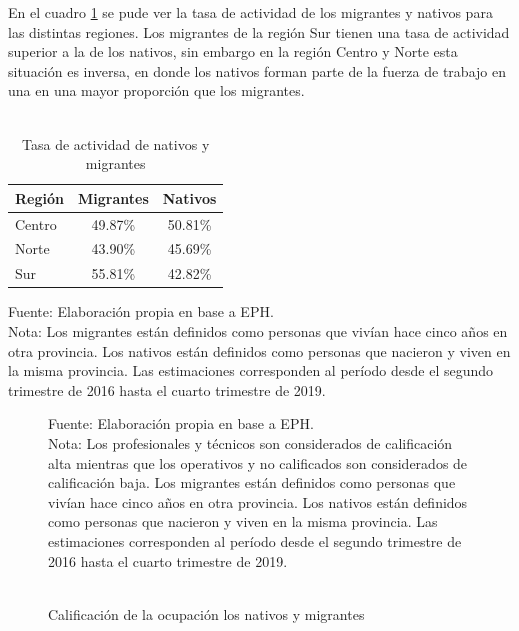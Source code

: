 \documentclass[12pt,a4paper]{article}
\begin{document}
En el cuadro \ref{cuadro:tasaactiv_mig} se pude ver la tasa de actividad de  los migrantes y nativos para las distintas regiones. Los migrantes de la región Sur tienen una tasa de actividad superior a la de los nativos, sin embargo en la región Centro y Norte esta situación es inversa, en donde los nativos forman parte de la fuerza de trabajo en una en una mayor proporción que los migrantes.
\begin{table}[htbp!]
\centering
\caption{\\Tasa de actividad de nativos y migrantes} 
\begin{tabular}{lcc}
  \hline
 Región & Migrantes & Nativos \\ 
  \hline
Centro & 49.87\% & 50.81\% \\ 
Norte & 43.90\% & 45.69\% \\ 
Sur & 55.81\%  & 42.82\% \\
   \hline
\end{tabular}
\label{cuadro:tasaactiv_mig}
\begin{flushleft}
\begin{scriptsize}
Fuente: Elaboración propia en base a EPH.\\
Nota: Los migrantes están definidos como personas que vivían hace cinco años en otra provincia. Los nativos están definidos como personas que nacieron y viven en la misma provincia. Las estimaciones corresponden al período desde el segundo trimestre de 2016 hasta el cuarto trimestre de 2019.
\end{scriptsize}
\end{flushleft}
\end{table}

\begin{figure}[htbp!]
\begin{center}
\caption{\\Calificación de la ocupación los nativos y migrantes}
\label{figure:calif_mig}
 
\end{center}
\begin{flushleft}
\begin{scriptsize}
Fuente: Elaboración propia en base a EPH.\\
Nota: Los profesionales y técnicos son considerados de calificación alta mientras que los operativos y no calificados son considerados de calificación baja. Los migrantes están definidos como personas que vivían hace cinco años en otra provincia. Los nativos están definidos como personas que nacieron y viven en la misma provincia. Las estimaciones corresponden al período desde el segundo trimestre de 2016 hasta el cuarto trimestre de 2019.
\end{scriptsize}
\end{flushleft}
\end{figure}
\end{document}
